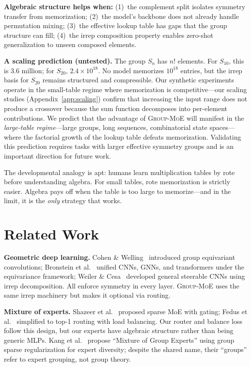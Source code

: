 \documentclass[10pt, letterpaper]{article}
\newcommand{\gmoe}{\textsc{Group-MoE}}
\begin{document}
\textbf{Algebraic structure helps when:} (1)~the complement split isolates symmetry transfer from memorization; (2)~the model's backbone does not already handle permutation mixing; (3)~the effective lookup table has gaps that the group structure can fill; (4)~the irrep composition property enables zero-shot generalization to unseen composed elements.

\textbf{A scaling prediction (untested).} The group $S_n$ has $n!$ elements. For $S_{10}$, this is 3.6 million; for $S_{20}$, $2.4 \times 10^{18}$. No model memorizes $10^{18}$ entries, but the irrep basis for $S_{20}$ remains structured and compressible. Our synthetic experiments operate in the small-table regime where memorization is competitive---our scaling studies (Appendix~\ref{app:scaling}) confirm that increasing the input range does not produce a crossover because the sum function decomposes into per-element contributions. We predict that the advantage of \gmoe{} will manifest in the \emph{large-table regime}---large groups, long sequences, combinatorial state spaces---where the factorial growth of the lookup table defeats memorization. Validating this prediction requires tasks with larger effective symmetry groups and is an important direction for future work.

The developmental analogy is apt: humans learn multiplication tables by rote before understanding algebra. For small tables, rote memorization is strictly easier. Algebra pays off when the table is too large to memorize---and in the limit, it is the \emph{only} strategy that works.

\section{Related Work}
\label{sec:related}

\textbf{Geometric deep learning.} Cohen \& Welling~\cite{cohen2016group} introduced group equivariant convolutions; Bronstein et al.~\cite{bronstein2021geometric} unified CNNs, GNNs, and transformers under the equivariance framework; Weiler \& Cesa~\cite{weiler2019general} developed general steerable CNNs using irrep decomposition. All enforce symmetry in every layer. \gmoe{} uses the same irrep machinery but makes it optional via routing.

\textbf{Mixture of experts.} Shazeer et al.~\cite{shazeer2017outrageously} proposed sparse MoE with gating; Fedus et al.~\cite{fedus2022switch} simplified to top-1 routing with load balancing. Our router and balance loss follow this design, but our experts have algebraic structure rather than being generic MLPs. Kang et al.~\cite{kang2025mixture} propose ``Mixture of Group Experts'' using group sparse regularization for expert diversity; despite the shared name, their ``groups'' refer to expert grouping, not group theory.
\end{document}

